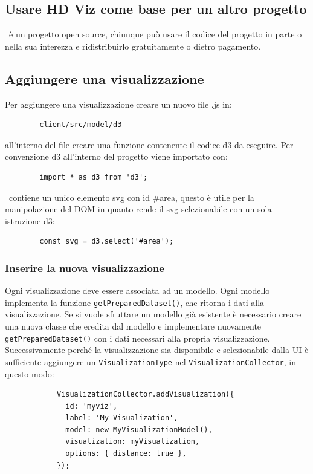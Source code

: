     \subsection{Usare HD Viz come base per un altro progetto}
    \hd\ è un progetto open source\glo , chiunque può usare il codice del progetto in parte o nella sua interezza e ridistribuirlo gratuitamente o dietro pagamento.
    \subsection{Aggiungere una visualizzazione}
    Per aggiungere una visualizzazione creare un nuovo file .js in:
    \begin{verbatim}
        client/src/model/d3
    \end{verbatim}
    all'interno del file creare una funzione contenente il codice d3 da eseguire. Per convenzione d3 all'interno del progetto viene importato con:
    \begin{verbatim}
        import * as d3 from 'd3';
    \end{verbatim}
    \hd\ contiene un unico elemento svg con id \#area, questo è utile per la manipolazione del DOM in quanto rende il svg selezionabile con un sola istruzione d3:
    \begin{verbatim}
        const svg = d3.select('#area');
    \end{verbatim}
        \subsubsection{Inserire la nuova visualizzazione}
        Ogni visualizzazione deve essere associata ad un modello. Ogni modello implementa la funzione  \texttt{getPreparedDataset()}, che ritorna i dati alla visualizzazione. Se si vuole sfruttare un modello già esistente è necessario creare una nuova classe che eredita dal modello e implementare nuovamente \texttt{getPreparedDataset()} con i dati necessari alla propria visualizzazione. Successivamente perché la visualizzazione sia disponibile e selezionabile dalla UI è sufficiente aggiungere un \texttt{VisualizationType} nel \texttt{VisualizationCollector}, in questo modo:
        \begin{verbatim}
            VisualizationCollector.addVisualization({
              id: 'myviz',
              label: 'My Visualization',
              model: new MyVisualizationModel(),
              visualization: myVisualization,
              options: { distance: true },
            });
        \end{verbatim}
        
